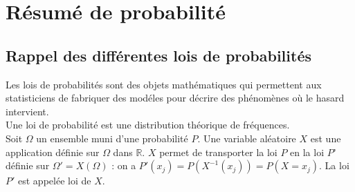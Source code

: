 \documentclass[a4paper,11pt]{book}
\begin{document}
\chapter{R\'esum\'e de probabilit\'e}
\section{Rappel des diff\'erentes lois de probabilit\'es}
Les lois de probabilit\'es sont des objets math\'ematiques qui permettent 
aux statisticiens de fabriquer des mod\'eles pour d\'ecrire des ph\'enom\`enes
o\`u le hasard intervient. \\
Une loi de probabilit\'e est une distribution th\'eorique de fr\'equences.\\
Soit $\Omega$ un ensemble muni d'une probabilit\'e $P$. Une variable 
al\'eatoire $X$ est une application d\'efinie sur $\Omega$ dans $\mathbb{R}$.
$X$ permet de transporter la loi $P$ en la loi $P$' d\'efinie sur 
$\Omega'=X(\Omega)$ : on a $P'(x_j)=P(X^{-1}(x_j))=P(X=x_j)$. 
La loi $P'$ est appel\'ee loi de $X$.\\
\end{document}
